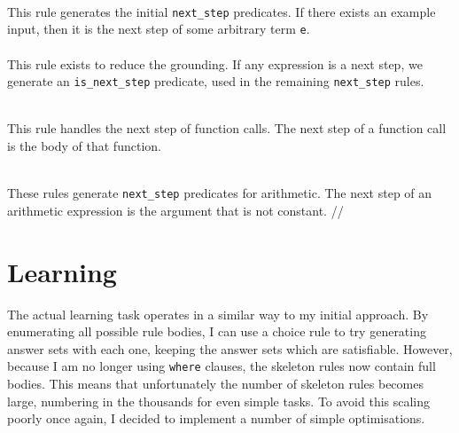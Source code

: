  
\mbox{} \\
This rule generates the initial \lstinline{next_step} predicates. If there exists an example input, then it is the next step of some arbitrary term \lstinline{e}. \\

 
\mbox{} \\
This rule exists to reduce the grounding. If any expression is a next step, we generate an \lstinline{is_next_step} predicate, used in the remaining \lstinline{next_step} rules.

 
\mbox{} \\
This rule handles the next step of function calls. The next step of a function call is the body of that function.

 
\mbox{} \\
These rules generate \lstinline{next_step} predicates for arithmetic. The next step of an arithmetic expression is the argument that is not constant. //%

\section{Learning}
The actual learning task operates in a similar way to my initial approach. By enumerating all possible rule bodies, I can use a choice rule to try generating answer sets with each one, keeping the answer sets which are satisfiable. However, because I am no longer using \lstinline{where} clauses, the skeleton rules now contain full bodies. This means that unfortunately the number of skeleton rules becomes large, numbering in the thousands for even simple tasks. To avoid this scaling poorly once again, I decided to implement a number of simple optimisations.%

